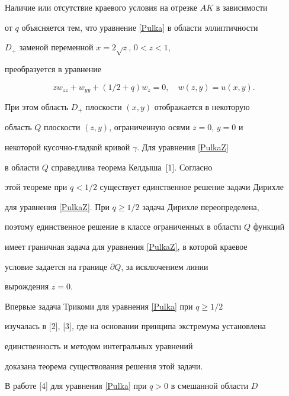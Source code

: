 \medskip





Наличие или отсутствие краевого условия на отрезке $AK$ в зависимости 


от $q$ объясняется тем, что уравнение \eqref{Pulka} в области эллиптичности


$D_+$ заменой переменной $x=2\sqrt{z}$, $0<z<1$,


преобразуется в уравнение


\begin{equation}\label{PulkaZ}


z w_{zz} + w_{yy} + (1/2 +q) w_z =0,\quad


w(z,y)=u(x,y).


\end{equation}


При этом область $D_+$ плоскости $(x,y)$ отображается в некоторую


область $Q$ плоскости $(z,y)$, ограниченную осями $z=0$, $y=0$ и 


некоторой кусочно-гладкой кривой $\gamma$. Для уравнения \eqref{PulkaZ} 


в области $Q$ справедлива теорема Келдыша~[1]. Согласно


этой теореме при $q<1/2$ существует единственное решение задачи Дирихле 


для уравнения \eqref{PulkaZ}. При $q\geq1/2$ задача Дирихле переопределена, 


поэтому единственное решение в классе ограниченных в области $Q$ функций 


имеет граничная задача для уравнения \eqref{PulkaZ}, в которой краевое 


условие задается на границе $\partial Q$, за исключением линии


вырождения $z=0$.





Впервые задача Трикоми для уравнения \eqref{Pulka} при $q\geq1/2$ 


изучалась в [2], [3], где на основании принципа экстремума установлена 


единственность и методом интегральных уравнений


доказана теорема существования решения этой задачи.





В работе [4] для уравнения \eqref{Pulka} при $q>0$ в смешанной области $D$ 


